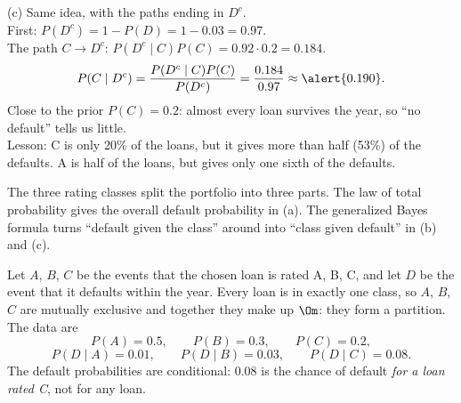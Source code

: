 \begin{slides}
	\small
	(c) Same idea, with the paths ending in $D^c$.
	\pause\\[1mm]
	First: $P(D^c)=1-P(D)=1-0.03=0.97$.
	\pause\\[1mm]
	The path $C\to D^c$: $P(D^c\mid C)P(C)=0.92\cdot0.2=0.184$.
	\pause
	\[ P(C\mid D^c)=\frac{P(D^c\mid C)P(C)}{P(D^c)}=\frac{0.184}{0.97}
		\approx\alert{0.190}. \]
	\pause
	Close to the prior $P(C)=0.2$: almost every loan survives the year, so
	``no default'' tells us little.
	\pause\\[2mm]
	\alert{Lesson:} C is only 20\% of the loans, but it gives more than half
	(53\%) of the defaults. A is half of the loans, but gives only one sixth
	of the defaults.
\end{slides}

\begin{solution}
	\idea The three rating classes split the portfolio into three parts. The
	law of total probability gives the overall default probability in (a). The
	generalized Bayes formula turns ``default given the class'' around into
	``class given default'' in (b) and (c).

	 Let $A$, $B$, $C$ be the events that the chosen
	loan is rated A, B, C, and let $D$ be the event that it defaults within the
	year. Every loan is in exactly one class, so $A$, $B$, $C$ are mutually
	exclusive and together they make up $\Om$: they form a partition. The data
	are
	\[ P(A)=0.5,\qquad P(B)=0.3,\qquad P(C)=0.2, \]
	\[ P(D\mid A)=0.01,\qquad P(D\mid B)=0.03,\qquad P(D\mid C)=0.08. \]
	The default probabilities are conditional: $0.08$ is the chance of default
	\emph{for a loan rated C}, not for any loan.


\end{solution}
